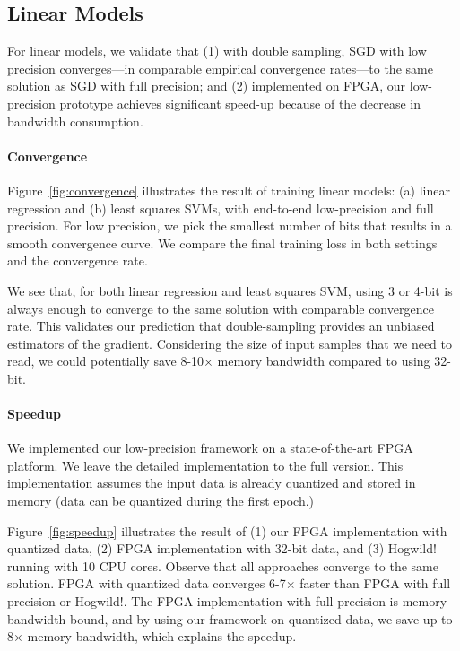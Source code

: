 \documentclass{article}
\begin{document}
\vspace{-1em}
\subsection{Linear Models}
\vspace{-0.5em}

For linear models, we validate that (1) 
with double sampling, SGD with low
precision converges---in
comparable empirical 
convergence rates---to the same solution
as SGD with full precision; and
(2) implemented on FPGA, our low-precision
prototype achieves significant speed-up
because of the decrease in bandwidth
consumption.

\vspace{-1em}
\paragraph{Convergence}

Figure~\ref{fig:convergence} illustrates
the result of training linear models:
(a) linear
regression and (b) least squares SVMs,
with end-to-end low-precision and 
full precision. For
low precision, we pick the 
smallest number of bits that
results in a smooth convergence
curve. We compare the final 
training loss in both settings 
and the convergence rate.

\vspace{-0.5em}
We see that, for both linear regression 
and least squares SVM,
using 3 or 4-bit is always enough
to converge to the same solution
with comparable convergence rate. 
This validates our prediction that
double-sampling provides an
unbiased estimators of the gradient.
Considering the size of input
samples that we need to read, we
could potentially save 8-10$\times$ 
memory bandwidth compared to using 
32-bit. 

\vspace{-1em}
\paragraph{Speedup}
We implemented our low-precision 
framework on a state-of-the-art 
FPGA platform. We leave the detailed 
implementation to the full version.
This implementation assumes the input
data is already quantized and
stored in memory (data can be
quantized during the
first epoch.)

\vspace{-0.5em}
Figure~\ref{fig:speedup} illustrates 
the result of (1) our FPGA
implementation with quantized data,
(2) FPGA implementation with 32-bit
data, and (3) Hogwild! running with
10 CPU cores.
Observe that all approaches
converge to the same solution.
FPGA with quantized data converges
6-7$\times$ faster
than FPGA with full precision
or Hogwild!. The FPGA implementation
with full precision is
memory-bandwidth bound, and by using our framework on quantized data, we save 
up to 8$\times$ memory-bandwidth, which
explains the speedup.
\end{document}
